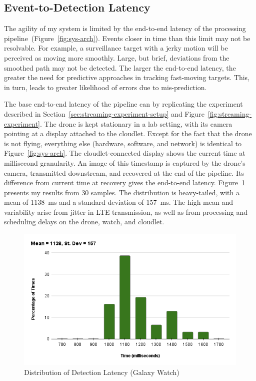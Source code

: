 \subsection{Event-to-Detection Latency}
\label{sec:event-to-detection-latency}

The agility of my system is limited by the end-to-end latency of the
processing pipeline~(Figure~\ref{fig:sys-arch}).  Events closer in
time than this limit may not be resolvable.  For example, a
surveillance target with a jerky motion will be perceived as moving
more smoothly.  Large, but brief, deviations from the smoothed path
may not be detected.  The larger the end-to-end latency, the greater
the need for predictive approaches in tracking fast-moving
targets.  This, in turn, leads to greater likelihood of errors due
to mis-prediction.

The base end-to-end latency of the pipeline can by replicating the experiment described in Section~\ref{sec:streaming-experiment-setup} and Figure~\ref{fig:streaming-experiment}. The
drone is kept stationary in a lab setting, with its camera pointing at a display attached to the cloudlet. Except
for the fact that the drone is not flying, everything else (hardware, software, and network) is identical to Figure~\ref{fig:sys-arch}.  The cloudlet-connected display shows the current time at millisecond
granularity.  An image of this timestamp is captured by the drone's camera, transmitted downstream, and recovered at the end of the pipeline.  Its difference from current time at recovery gives the end-to-end latency.  Figure~\ref{fig:e2elatency} presents my results from 30 samples. The distribution is heavy-tailed, with a mean of 1138~ms and a standard deviation of 157~ms.  The high mean and variability arise from jitter in LTE transmission, as well as from processing and scheduling delays on the drone, watch, and cloudlet.


\begin{figure}
\centering
\includegraphics[width=0.7\linewidth]{chapter4/FIGS/new_mtp_watch.png}
\caption{Distribution of Detection Latency (Galaxy Watch)}
\label{fig:e2elatency}
\end{figure}


